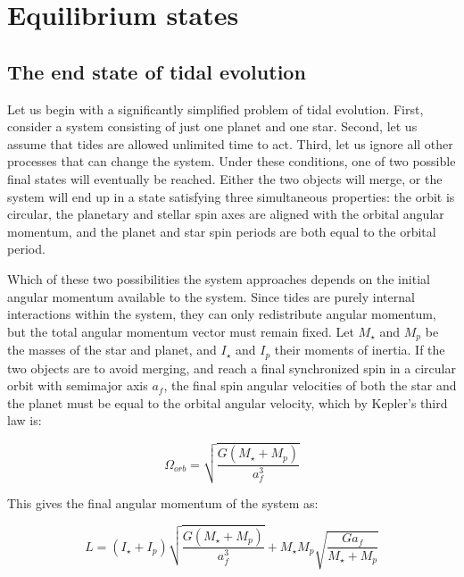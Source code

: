 \section{Equilibrium states}
%
\label{sec:equilibrium}

\subsection{The end state of tidal evolution}

Let us begin with a significantly simplified problem of tidal evolution. First,
consider a system consisting of just one planet and one star. Second, let us
assume that tides are allowed unlimited time to act. Third, let us ignore all
other processes that can change the system. Under these conditions, one of two
possible final states will eventually be reached. Either the two objects will
merge, or the system will end up in a state satisfying three simultaneous
properties: the orbit is circular, the planetary and stellar spin axes are
aligned with the orbital angular momentum, and the planet and star spin periods
are both equal to the orbital period.

Which of these two possibilities the system approaches depends on the initial
angular momentum available to the system. Since tides are purely internal
interactions within the system, they can only redistribute angular momentum, but
the total angular momentum vector must remain fixed. Let $M_\star$ and $M_p$ be
the masses of the star and planet, and $I_\star$ and $I_p$ their moments of
inertia.  If the two objects are to avoid merging, and reach a final
synchronized spin in a circular orbit with semimajor axis $a_f$, the final spin
angular velocities of both the star and the planet must be equal to the orbital
angular velocity, which by Kepler's third law is:

\begin{equation}
%
    \Omega_{orb} = \sqrt{\frac{G (M_\star + M_p)}{a_f^3}}
%
    \label{eq:orbital_angular_velocity}
%
\end{equation}

This gives the final angular momentum of the system as:

\begin{equation}
%
    L
%
    =
%
    \left(I_\star + I_p\right) \sqrt{\frac{G (M_\star + M_p)}{a_f^3}}
%
    +
%
    M_\star M_p \sqrt{\frac{G a_f}{M_\star + M_p}}
%
    \label{eq:equilibrium_angmom}
%
\end{equation}

